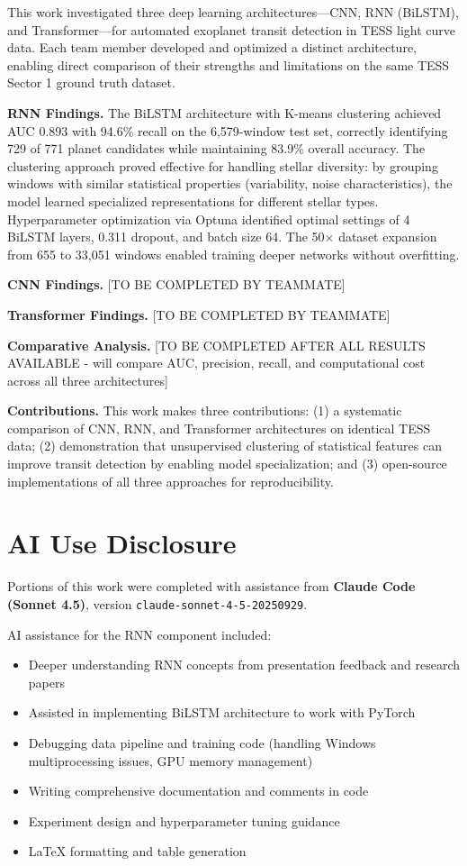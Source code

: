 \documentclass[letterpaper]{article} %
\begin{document}
This work investigated three deep learning architectures---CNN, RNN (BiLSTM), and Transformer---for automated exoplanet transit detection in TESS light curve data. Each team member developed and optimized a distinct architecture, enabling direct comparison of their strengths and limitations on the same TESS Sector 1 ground truth dataset.

\textbf{RNN Findings.} The BiLSTM architecture with K-means clustering achieved AUC 0.893 with 94.6\% recall on the 6,579-window test set, correctly identifying 729 of 771 planet candidates while maintaining 83.9\% overall accuracy. The clustering approach proved effective for handling stellar diversity: by grouping windows with similar statistical properties (variability, noise characteristics), the model learned specialized representations for different stellar types. Hyperparameter optimization via Optuna identified optimal settings of 4 BiLSTM layers, 0.311 dropout, and batch size 64. The 50$\times$ dataset expansion from 655 to 33,051 windows enabled training deeper networks without overfitting.

\textbf{CNN Findings.} [TO BE COMPLETED BY TEAMMATE]

\textbf{Transformer Findings.} [TO BE COMPLETED BY TEAMMATE]

\textbf{Comparative Analysis.} [TO BE COMPLETED AFTER ALL RESULTS AVAILABLE - will compare AUC, precision, recall, and computational cost across all three architectures]

\textbf{Contributions.} This work makes three contributions: (1) a systematic comparison of CNN, RNN, and Transformer architectures on identical TESS data; (2) demonstration that unsupervised clustering of statistical features can improve transit detection by enabling model specialization; and (3) open-source implementations of all three approaches for reproducibility.

\section*{AI Use Disclosure}

Portions of this work were completed with assistance from \textbf{Claude Code (Sonnet 4.5)}, version \texttt{claude-sonnet-4-5-20250929}.

AI assistance for the RNN component included:
\begin{itemize}
\item Deeper understanding RNN concepts from presentation feedback and research papers
\item Assisted in implementing BiLSTM architecture to work with PyTorch
\item Debugging data pipeline and training code (handling Windows multiprocessing issues, GPU memory management)
\item Writing comprehensive documentation and comments in code
\item Experiment design and hyperparameter tuning guidance
\item LaTeX formatting and table generation
\end{itemize}
\end{document}
